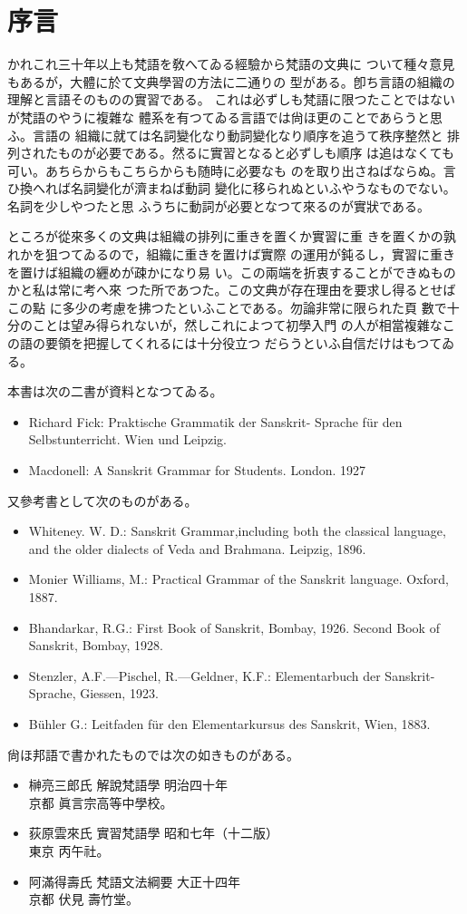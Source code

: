 \chapter*{序言}
\label{cha:preface}
かれこれ三十年以上も梵語を敎へてゐる經驗から梵語の文典に
ついて種々意見もあるが，大體に於て文典學習の方法に二通りの
型がある。卽ち言語の組織の理解と言語そのものの實習である。
これは必ずしも梵語に限つたことではないが梵語のやうに複雜な
體系を有つてゐる言語では尙ほ更のことであらうと思ふ。言語の
組織に就ては名詞變化なり動詞變化なり順序を追うて秩序整然と
排列されたものが必要である。然るに實習となると必ずしも順序
は追はなくても可い。あちらからもこちらからも随時に必要なも
のを取り出さねばならぬ。言ひ換へれば名詞變化が濟まねば動詞
變化に移られぬといふやうなものでない。名詞を少しやつたと思
ふうちに動詞が必要となつて來るのが實狀である。

ところが從來多くの文典は組織の排列に重きを置くか實習に重
きを置くかの孰れかを狙つてゐるので，組織に重きを置けば實際
の運用が鈍るし，實習に重きを置けば組織の纒めが疎かになり易
い。この兩端を折衷することができぬものかと私は常に考へ來
つた所であつた。この文典が存在理由を要求し得るとせばこの點
に多少の考慮を拂つたといふことである。勿論非常に限られた頁
數で十分のことは望み得られないが，然しこれによつて初學入門
の人が相當複雜なこの語の要領を把握してくれるには十分役立つ
だらうといふ自信だけはもつてゐる。

本書は次の二書が資料となつてゐる。
\begin{itemize}
\item Richard Fick: Praktische Grammatik der Sanskrit-
Sprache für den Selbstunterricht. Wien und Leipzig.
\item Macdonell: A Sanskrit Grammar for Students. London. 1927
\end{itemize}

又參考書として次のものがある。
\begin{itemize}
\item Whiteney. W. D.: Sanskrit Grammar,including both the
classical language, and the older dialects of Veda and Brahmana. Leipzig, 1896.
\item Monier Williams, M.: Practical Grammar of the San\-skrit language. Oxford, 1887.
\item Bhandarkar, R.G.: First Book of Sanskrit, Bombay, 1926. Second Book of Sanskrit, Bombay, 1928.
\item Stenzler, A.F.---Pischel, R.---Geldner, K.F.: Elementar\-buch der Sanskrit-Sprache, Giessen, 1923.
\item Bühler G.: Leitfaden für den Elementarkursus des Sanskrit, Wien, 1883.
\end{itemize}

尙ほ邦語で書かれたものでは次の如きものがある。
\begin{itemize}
\item 榊亮三郎氏 解說梵語學 明治四十年\\
\hfil 京都 眞言宗高等中學校。
\item 荻原雲來氏 實習梵語學 昭和七年（十二版）\\
\hfil 東京 丙午社。
\item 阿滿得壽氏 梵語文法綱要 大正十四年\\
\hfil 京都 伏見 壽竹堂。
\end{itemize}

